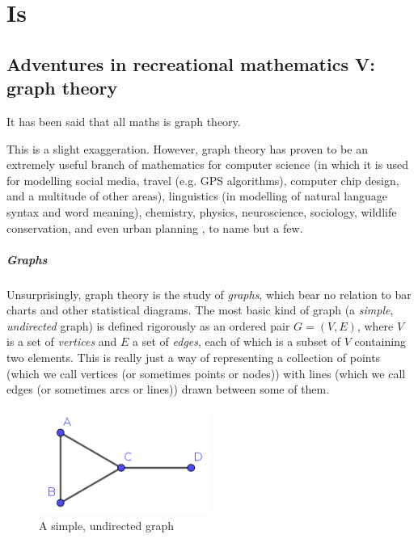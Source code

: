 \documentclass[11pt,a4paper]{report}
\begin{document}
\chapter{Is}

\section{Adventures in recreational mathematics V: graph theory}

\begin{adjustwidth}{5cm}{5cm}

It has been said that all maths is graph theory.

This is a slight exaggeration. However, graph theory has proven to be an extremely useful branch of mathematics for computer science (in which it is used for modelling social media, travel (e.g. GPS algorithms), computer chip design, and a multitude of other areas), linguistics (in modelling of natural language syntax and word meaning), chemistry, physics, neuroscience, sociology, wildlife conservation, and even urban planning \cite{acityisnotatree}, to name but a few.

\paragraph{Graphs}

Unsurprisingly, graph theory is the study of \textit{graphs}, which bear no relation to bar charts and other statistical diagrams. The most basic kind of graph (a \textit{simple}, \textit{undirected} graph) is defined rigorously as an ordered pair \(G=(V,E)\), where \(V\) is a set of \textit{vertices} and \(E\) a set of \textit{edges}, each of which is a subset of \(V\) containing two elements. This is really just a way of representing a collection of points (which we call vertices (or sometimes points or nodes)) with lines (which we call edges (or sometimes arcs or lines)) drawn between some of them.

\begin{figure}[h]
	\centering
	\includegraphics[width=0.5\textwidth]{simplegraph}
	\caption{A simple, undirected graph}
	\label{simplegraph}
\end{figure}


\end{adjustwidth}
\end{document}
